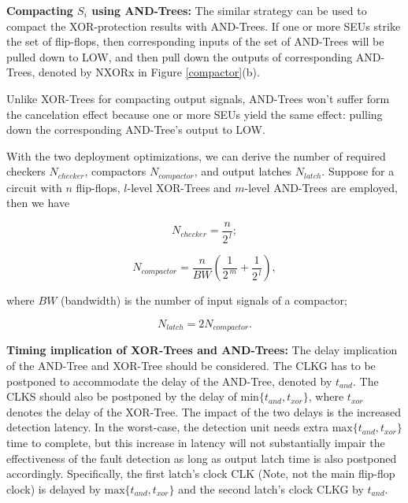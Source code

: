 
\textbf{Compacting $S_i$  using AND-Trees:} The similar strategy can be used to compact the XOR-protection results with AND-Trees. If one or more SEUs strike the set of flip-flops, then corresponding inputs of the set of AND-Trees will be pulled down to LOW, and then pull down the outputs of corresponding AND-Trees, denoted by NXORx in Figure \ref{compactor}(b).

Unlike XOR-Trees for compacting output signals, AND-Trees won't suffer form the cancelation effect because one or more SEUs yield the same effect: pulling down the corresponding AND-Tree's output to LOW.

With the two deployment optimizations, we can derive the number of required checkers $N_{checker}$, compactors $N_{compactor}$, and output latches $N_{latch}$. Suppose for a circuit with $n$ flip-flops, $l$-level XOR-Trees and $m$-level AND-Trees are employed, then we have

\begin{equation}\label{nchecker}
  N_{checker} = \frac{n}{2^{\,l}};
\end{equation}

\begin{equation}\label{ncompactor}
  N_{compactor} = \frac{n}{BW}( \frac{1} {2^{\,m}}+\frac{1}{2^{\,l}}),
\end{equation}

where $BW$ (bandwidth) is the number of input signals of a compactor;

\begin{equation}\label{nlatch}
  N_{latch} = 2 N_{compactor}.
\end{equation}

\textbf{Timing implication of XOR-Trees and AND-Trees:} The delay implication of the AND-Tree and XOR-Tree should be considered. The CLKG has to be postponed to accommodate the delay of the AND-Tree, denoted by $t_{and}$. The CLKS should also be postponed by the delay of $\mbox{min}\{t_{and}, t_{xor}\}$, where $t_{xor}$ denotes the delay of the XOR-Tree. The impact of the two delays is the increased detection latency. In the worst-case, the detection unit needs extra $\mbox{max}\{t_{and}, t_{xor}\}$ time to complete, but this increase in latency will not substantially impair the effectiveness of the fault detection as long as output latch time is also postponed accordingly. Specifically, the first latch's clock CLK (Note, not the main flip-flop clock) is delayed by $\mbox{max}\{t_{and}, t_{xor}\}$ and the second latch's clock CLKG by $t_{and}$.

